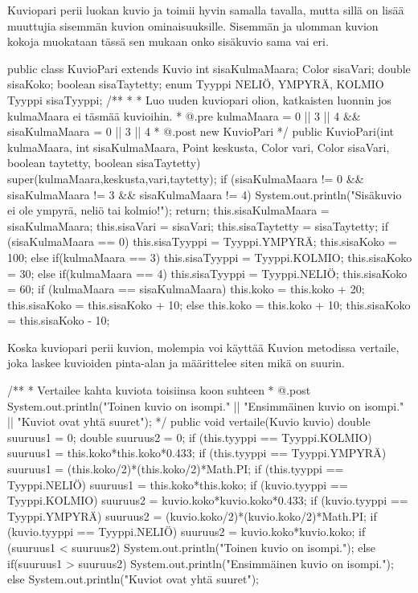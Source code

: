 Kuviopari perii luokan kuvio ja toimii hyvin samalla tavalla, mutta sillä on lisää
muuttujia sisemmän kuvion ominaisuuksille. Sisemmän ja ulomman kuvion kokoja muokataan
tässä sen mukaan onko sisäkuvio sama vai eri.
\begin{javacode}
public class KuvioPari extends Kuvio{
  int sisaKulmaMaara;
  Color sisaVari;
  double sisaKoko;
  boolean sisaTaytetty;
  enum Tyyppi{
    NELIÖ, YMPYRÄ, KOLMIO
  }
  Tyyppi sisaTyyppi;
  /**
   * 
   * Luo uuden kuviopari olion, katkaisten luonnin jos kulmaMaara ei täsmää kuvioihin.
   * @.pre kulmaMaara = 0 || 3 || 4 && sisaKulmaMaara = 0 || 3 || 4
   * @.post new KuvioPari
   */
  public KuvioPari(int kulmaMaara, int sisaKulmaMaara, Point keskusta, Color vari,
  Color sisaVari, boolean taytetty, boolean sisaTaytetty) {
    super(kulmaMaara,keskusta,vari,taytetty);
    if (sisaKulmaMaara != 0 && sisaKulmaMaara != 3 && sisaKulmaMaara != 4) {
      System.out.println("Sisäkuvio ei ole ympyrä, neliö tai kolmio!");
      return;
    }
    this.sisaKulmaMaara = sisaKulmaMaara;
    this.sisaVari = sisaVari;
    this.sisaTaytetty = sisaTaytetty;
    if (sisaKulmaMaara == 0) {
      this.sisaTyyppi = Tyyppi.YMPYRÄ;
      this.sisaKoko = 100;
    }
    else if(kulmaMaara == 3){
      this.sisaTyyppi = Tyyppi.KOLMIO;
      this.sisaKoko = 30;
    }
    else if(kulmaMaara == 4){
      this.sisaTyyppi = Tyyppi.NELIÖ;
      this.sisaKoko = 60;
    }
    if (kulmaMaara == sisaKulmaMaara) {
      this.koko = this.koko + 20;
      this.sisaKoko = this.sisaKoko + 10;
    }else {
      this.koko = this.koko + 10;
      this.sisaKoko = this.sisaKoko - 10;
    }
  }
}
\end{javacode}

Koska kuviopari perii kuvion, molempia voi käyttää Kuvion metodissa vertaile,
joka laskee kuvioiden pinta-alan ja määrittelee siten mikä on suurin.
\begin{javacode}
  /**
   * Vertailee kahta kuviota toisiinsa koon suhteen
   * @.post System.out.println("Toinen kuvio on isompi." || "Ensimmäinen kuvio on
   isompi." || "Kuviot ovat yhtä suuret");
   */
  public void vertaile(Kuvio kuvio) {
    double suuruus1 = 0;
    double suuruus2 = 0;
    if (this.tyyppi == Tyyppi.KOLMIO) {
      suuruus1 = this.koko*this.koko*0.433;
    }
    if (this.tyyppi == Tyyppi.YMPYRÄ) {
      suuruus1 = (this.koko/2)*(this.koko/2)*Math.PI;
    }
    if (this.tyyppi == Tyyppi.NELIÖ) {
      suuruus1 = this.koko*this.koko;
    }
    if (kuvio.tyyppi == Tyyppi.KOLMIO) {
      suuruus2 = kuvio.koko*kuvio.koko*0.433;
    }
    if (kuvio.tyyppi == Tyyppi.YMPYRÄ) {
      suuruus2 = (kuvio.koko/2)*(kuvio.koko/2)*Math.PI;
    }
    if (kuvio.tyyppi == Tyyppi.NELIÖ) {
      suuruus2 = kuvio.koko*kuvio.koko;
    }
    if (suuruus1 < suuruus2) {
      System.out.println("Toinen kuvio on isompi.");
    } else if(suuruus1 > suuruus2) {
      System.out.println("Ensimmäinen kuvio on isompi.");
    } else {
      System.out.println("Kuviot ovat yhtä suuret");
    }
  }
\end{javacode}

